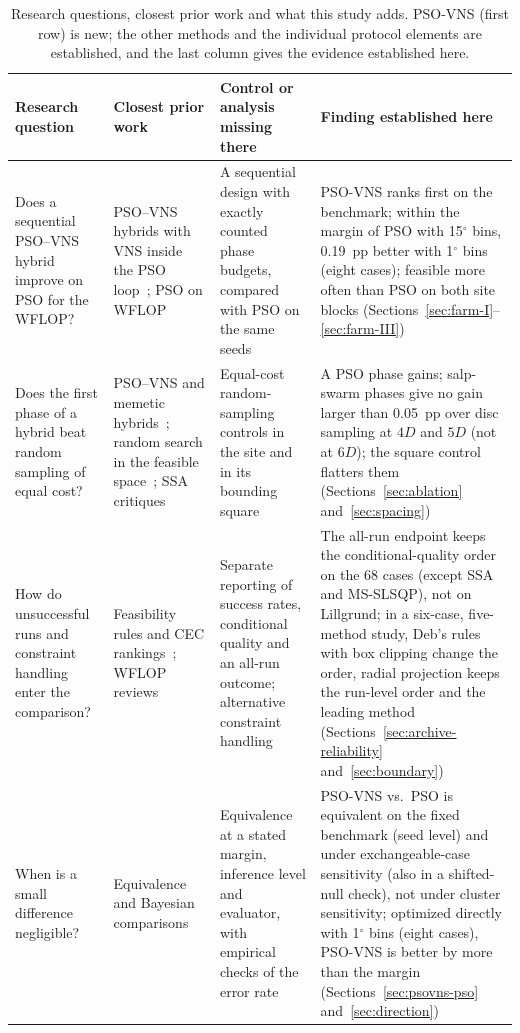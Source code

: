 \begin{table}[!t]
\centering
\caption{Research questions, closest prior work and what this study adds. PSO-VNS (first row) is new; the other methods and the individual protocol elements are established, and the last column gives the evidence established here.}
\label{tab:rq-matrix}
\footnotesize
\begin{tabular}{@{}>{\raggedright\arraybackslash}p{}>{\raggedright\arraybackslash}p{}>{\raggedright\arraybackslash}p{}>{\raggedright\arraybackslash}p{}@{}}
\toprule
Research question & Closest prior work & Control or analysis missing there & Finding established here \\
\midrule
Does a sequential PSO--VNS hybrid improve on PSO for the WFLOP? & PSO--VNS hybrids with VNS inside the PSO loop~\cite{Tasgetiren2007,Marinakis2017,Gumaida2019}; PSO on WFLOP~\cite{Pookpunt2013,Asaah2021} & A sequential design with exactly counted phase budgets, compared with PSO on the same seeds & PSO-VNS ranks first on the benchmark; within the margin of PSO with 15$^\circ$ bins, 0.19~pp better with 1$^\circ$ bins (eight cases); feasible more often than PSO on both site blocks (Sections~\ref{sec:farm-I}--\ref{sec:farm-III}) \\
Does the first phase of a hybrid beat random sampling of equal cost? & PSO--VNS and memetic hybrids~\cite{Tasgetiren2007,Marinakis2017,Gumaida2019}; random search in the feasible space~\cite{Feng2015}; SSA critiques~\cite{Castelli2022,CamachoVillalon2023} & Equal-cost random-sampling controls in the site and in its bounding square & A PSO phase gains; salp-swarm phases give no gain larger than 0.05~pp over disc sampling at $4D$ and $5D$ (not at $6D$); the square control flatters them (Sections~\ref{sec:ablation} and~\ref{sec:spacing}) \\
How do unsuccessful runs and constraint handling enter the comparison? & Feasibility rules and CEC rankings~\cite{Deb2000,Wu2017}; WFLOP reviews~\cite{Azlan2021} & Separate reporting of success rates, conditional quality and an all-run outcome; alternative constraint handling & The all-run endpoint keeps the conditional-quality order on the 68 cases (except SSA and MS-SLSQP), not on Lillgrund; in a six-case, five-method study, Deb's rules with box clipping change the order, radial projection keeps the run-level order and the leading method (Sections~\ref{sec:archive-reliability} and~\ref{sec:boundary}) \\
When is a small difference negligible? & Equivalence and Bayesian comparisons~\cite{Lakens2017,Benavoli2016,Benavoli2017,Carrasco2020} & Equivalence at a stated margin, inference level and evaluator, with empirical checks of the error rate & PSO-VNS vs.\ PSO is equivalent on the fixed benchmark (seed level) and under exchangeable-case sensitivity (also in a shifted-null check), not under cluster sensitivity; optimized directly with 1$^\circ$ bins (eight cases), PSO-VNS is better by more than the margin (Sections~\ref{sec:psovns-pso} and~\ref{sec:direction}) \\

\end{tabular}
\end{table}
